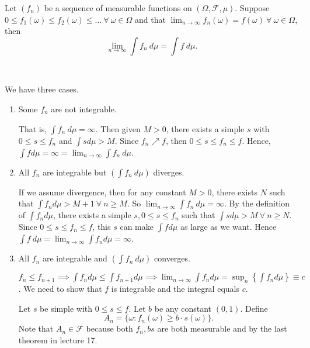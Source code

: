 \documentclass[class=article,crop=false]{standalone}
\begin{document}
\begin{thm}
	Let $ (f_n)$ be a sequence of measurable functions on $(\Omega,\mathcal{F},\mu) $. Suppose $ 0\leq f_1(\omega)\leq f_2(\omega)\leq \ldots \ \forall \ \omega \in \Omega$ and that $ \lim_{ n \to \infty} f_n(\omega) = f(\omega) \ \forall \ \omega \in \Omega$, then
	\[
	\lim_{ n \to \infty} \int f_n \ d \mu=\int f\ d \mu
	.\] 
\end{thm}
~\begin{prf}
We have three cases.
\begin{enumerate}[label=\arabic*)]
	\item Some $ f_n$ are not integrable. 

		That is, $ \int f_n \ d \mu = \infty$. Then given $ M>0$, there exists a simple  $ s$ with  $ 0\leq s \leq f_n$ and $ \int s d \mu > M$. Since $ f_n \nearrow f$, then $ 0\leq s \leq f_n \leq f$. Hence, $ \int f d \mu = \infty = \lim_{ n \to \infty} \int f_n \ d \mu $. 
	\item All $ f_n$ are integrable but $ (\int f_n\ d \mu ) $ diverges.
		
		If we assume divergence, then for any constant $ M >0$, there exists  $ N$  such that $ \int f_n d \mu > M+1 \ \forall \ n\geq M$. So $ \lim_{ n \to \infty} \int f_n \ d \mu = \infty$. By the definition of $ \int f_n d \mu$, there exists a simple $ s, 0\leq s \leq f_n$ such that $ \int s d \mu>M \ \forall \ n\geq N$. Since $ 0\leq s \leq f_n \leq f$,  this $ s$ can make  $ \int f d \mu$ as large as we want. Hence $ \int f \ d \mu = \lim_{ n \to \infty}  \int f_n d \mu = \infty$.
	\item All $ f_n$ are integrable and $ (\int f_n \ d \mu)$ converges.

		$ f_n \leq f_{n+1} \implies \int f_n d \mu \leq \int f_{n+1} d \mu \implies \lim_{ n \to \infty} \int f_n d \mu = \sup_n \left\{\int f_n d \mu \right\} \equiv c$. We need to show that $ f$ is integrable and the integral equals  $ c$.
		
		Let $ s$ be simple with $ 0\leq s \leq f$. Let  $ b$ be any constant  $ (0,1)$. Define
		 \[
			 A_n = \{\omega: f_n(\omega) \geq b \cdot  s(\omega)\} 
		.\] 
		Note that $ A_n \in \mathcal{F}$ because both $ f_n, bs$ are both measurable and by the last theorem in lecture 17.
\end{enumerate}
\end{prf}
\end{document}
